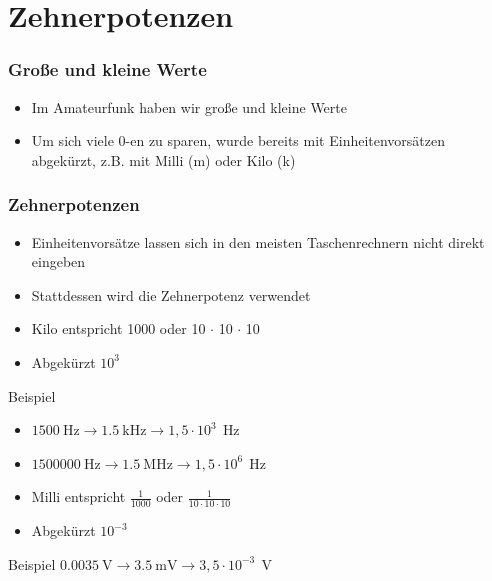 
\section{Zehnerpotenzen}
\label{section:zehnerpotenzen}
\begin{frame}%

\frametitle{Große und kleine Werte}
\begin{itemize}
  \item Im Amateurfunk haben wir große und kleine Werte
  \item Um sich viele 0-en zu sparen, wurde bereits mit Einheitenvorsätzen abgekürzt, z.B. mit Milli (m) oder Kilo (k)
  \end{itemize}
\end{frame}

\begin{frame}
\frametitle{Zehnerpotenzen}
\begin{itemize}
  \item Einheitenvorsätze lassen sich in den meisten Taschenrechnern nicht direkt eingeben
  \item Stattdessen wird die Zehnerpotenz verwendet
  \item Kilo entspricht 1000 oder 10 $\cdot$ 10 $\cdot$ 10
  \item Abgekürzt $10^3$
  \end{itemize}
    \pause
    \vspace{1cm}
    \begin{exampleblock}{Beispiel}
        \begin{itemize}
            \item $\qty{1500}{\hertz} \rightarrow \qty{1,5}{\kilo\hertz} \rightarrow 1,5 \cdot 10^3~\qty{}{\hertz}$
            \item $\qty{1500000}{\hertz} \rightarrow \qty{1,5}{\mega\hertz} \rightarrow 1,5 \cdot 10^6~\qty{}{\hertz}$
        \end{itemize}

    \end{exampleblock}
\end{frame}

\begin{frame}\begin{itemize}
  \item Milli entspricht  $\frac{1}{1000}$ oder $\frac{1}{10 \cdot 10 \cdot 10}$
  \item Abgekürzt $10^{-3}$
  \end{itemize}
    \pause
    \begin{exampleblock}{Beispiel}
        $\qty{0,0035}{\volt} \rightarrow \qty{3,5}{\milli\volt} \rightarrow 3,5 \cdot 10^{-3}~\qty{}{\volt}$
    \end{exampleblock}
\end{frame}

